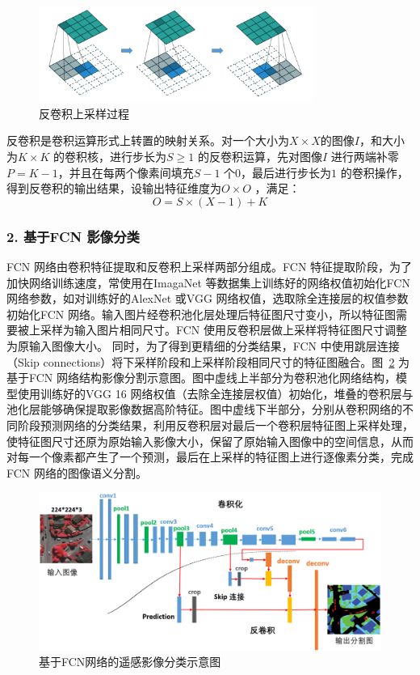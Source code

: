 \begin{figure}[htb]
  \centering
  \includegraphics[width=0.8\textwidth]{figures/deconv}
  \caption{反卷积上采样过程}\label{fig:deconv}
\end{figure}

反卷积是卷积运算形式上转置的映射关系。对一个大小为$X\times X$的图像$\textit{I}$，和大小为$K\times K$ 的卷积核，进行步长为$S \geq 1$ 的反卷积运算，先对图像$\textit{I}$ 进行两端补零$P=K-1$，并且在每两个像素间填充$S-1$ 个$0$，最后进行步长为$1$ 的卷积操作，得到反卷积的输出结果，设输出特征维度为$O \times O$ ，满足：
\begin{equation}
  \label{eq:2-20}
  O = S \times (X - 1) + K
\end{equation}

\subsubsection*{2. 基于FCN 影像分类}
\label{subsec:chap02-2-2-2}
FCN 网络由卷积特征提取和反卷积上采样两部分组成。FCN 特征提取阶段，为了加快网络训练速度，常使用在ImagaNet 等数据集上训练好的网络权值初始化FCN 网络参数，如对训练好的AlexNet\cite{krizhevsky2012imagenet} 或VGG\cite{simonyan2014very} 网络权值，选取除全连接层的权值参数初始化FCN 网络。输入图片经卷积池化层处理后特征图尺寸变小，所以特征图需要被上采样为输入图片相同尺寸。FCN 使用反卷积层做上采样将特征图尺寸调整为原输入图像大小。 同时，为了得到更精细的分类结果，FCN 中使用跳层连接（Skip connections）将下采样阶段和上采样阶段相同尺寸的特征图融合。图~\ref{fig:vgg-fcn} 为基于FCN 网络结构影像分割示意图。图中虚线上半部分为卷积池化网络结构，模型使用训练好的VGG 16 网络权值（去除全连接层权值）初始化，堆叠的卷积层与池化层能够确保提取影像数据高阶特征。图中虚线下半部分，分别从卷积网络的不同阶段预测网络的分类结果，利用反卷积层对最后一个卷积层特征图上采样处理，使特征图尺寸还原为原始输入影像大小，保留了原始输入图像中的空间信息，从而对每一个像素都产生了一个预测，最后在上采样的特征图上进行逐像素分类，完成FCN 网络的图像语义分割。

\begin{figure}[htb]
  \centering
  \includegraphics[width=1.0\textwidth]{figures/vgg-fcn}
  \caption{基于FCN网络的遥感影像分类示意图}\label{fig:vgg-fcn}
\end{figure}

